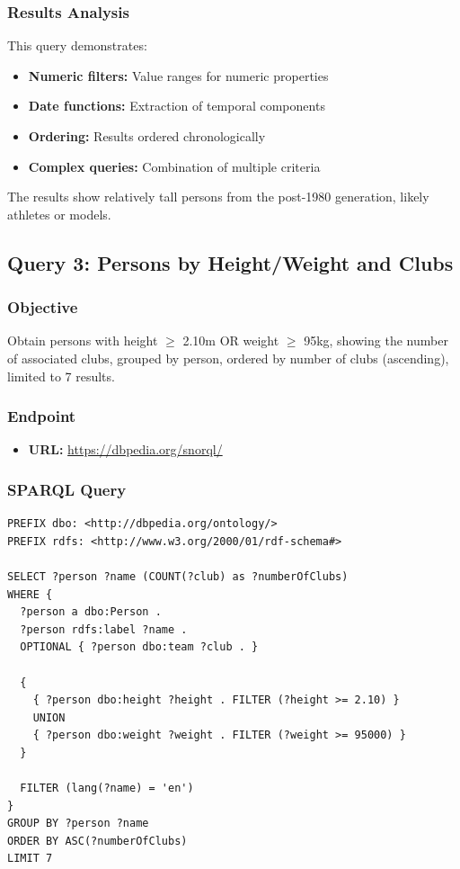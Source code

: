 \documentclass[12pt,a4paper]{article}
\begin{document}
\subsubsection{Results Analysis}

This query demonstrates:
\begin{itemize}
    \item \textbf{Numeric filters:} Value ranges for numeric properties
    \item \textbf{Date functions:} Extraction of temporal components
    \item \textbf{Ordering:} Results ordered chronologically
    \item \textbf{Complex queries:} Combination of multiple criteria
\end{itemize}

The results show relatively tall persons from the post-1980 generation, likely athletes or models.

\subsection{Query 3: Persons by Height/Weight and Clubs}

\subsubsection{Objective}

Obtain persons with height $\geq$ 2.10m OR weight $\geq$ 95kg, showing the number of associated clubs, grouped by person, ordered by number of clubs (ascending), limited to 7 results.

\subsubsection{Endpoint}

\begin{itemize}
    \item \textbf{URL:} \url{https://dbpedia.org/snorql/}
\end{itemize}

\subsubsection{SPARQL Query}

\begin{lstlisting}[language=SPARQL, caption={Query 3: Persons by height/weight and number of clubs}]
PREFIX dbo: <http://dbpedia.org/ontology/>
PREFIX rdfs: <http://www.w3.org/2000/01/rdf-schema#>

SELECT ?person ?name (COUNT(?club) as ?numberOfClubs)
WHERE {
  ?person a dbo:Person .
  ?person rdfs:label ?name .
  OPTIONAL { ?person dbo:team ?club . }
  
  {
    { ?person dbo:height ?height . FILTER (?height >= 2.10) }
    UNION
    { ?person dbo:weight ?weight . FILTER (?weight >= 95000) }
  }
  
  FILTER (lang(?name) = 'en')
}
GROUP BY ?person ?name
ORDER BY ASC(?numberOfClubs)
LIMIT 7
\end{lstlisting}
\end{document}
